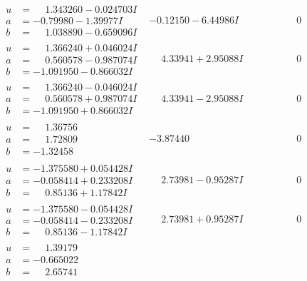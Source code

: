 \documentclass[1p]{elsarticle_modified}
\theoremstyle{definition}
\begin{document}
$$\begin{array}{c|c|c}
\begin{aligned}
u &= \phantom{-}1.343260 - 0.024703 I \\
a &= -0.79980 - 1.39977 I \\
b &= \phantom{-}1.038890 - 0.659096 I\end{aligned}
 & -0.12150 - 6.44986 I & \phantom{-0.000000 } 0 \\ \hline\begin{aligned}
u &= \phantom{-}1.366240 + 0.046024 I \\
a &= \phantom{-}0.560578 - 0.987074 I \\
b &= -1.091950 - 0.866032 I\end{aligned}
 & \phantom{-}4.33941 + 2.95088 I & \phantom{-0.000000 } 0 \\ \hline\begin{aligned}
u &= \phantom{-}1.366240 - 0.046024 I \\
a &= \phantom{-}0.560578 + 0.987074 I \\
b &= -1.091950 + 0.866032 I\end{aligned}
 & \phantom{-}4.33941 - 2.95088 I & \phantom{-0.000000 } 0 \\ \hline\begin{aligned}
u &= \phantom{-}1.36756\phantom{ +0.000000I} \\
a &= \phantom{-}1.72809\phantom{ +0.000000I} \\
b &= -1.32458\phantom{ +0.000000I}\end{aligned}
 & -3.87440\phantom{ +0.000000I} & \phantom{-0.000000 } 0 \\ \hline\begin{aligned}
u &= -1.375580 + 0.054428 I \\
a &= -0.058414 + 0.233208 I \\
b &= \phantom{-}0.85136 + 1.17842 I\end{aligned}
 & \phantom{-}2.73981 - 0.95287 I & \phantom{-0.000000 } 0 \\ \hline\begin{aligned}
u &= -1.375580 - 0.054428 I \\
a &= -0.058414 - 0.233208 I \\
b &= \phantom{-}0.85136 - 1.17842 I\end{aligned}
 & \phantom{-}2.73981 + 0.95287 I & \phantom{-0.000000 } 0 \\ \hline\begin{aligned}
u &= \phantom{-}1.39179\phantom{ +0.000000I} \\
a &= -0.665022\phantom{ +0.000000I} \\
b &= \phantom{-}2.65741\phantom{ +0.000000I}\end{aligned}

\end{array}$$
\end{document}
